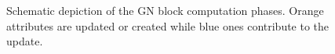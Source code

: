 \begin{figure}[H]
    \captionsetup{width=\dimexpr\textwidth-1.5cm\relax}
    \caption{Schematic depiction of the GN block computation phases. 
    \textcolor{tum-orange}{Orange} attributes are updated or created 
    while \textcolor{tum-dark-blue}{blue} ones contribute to the 
    update.}

\end{figure}
